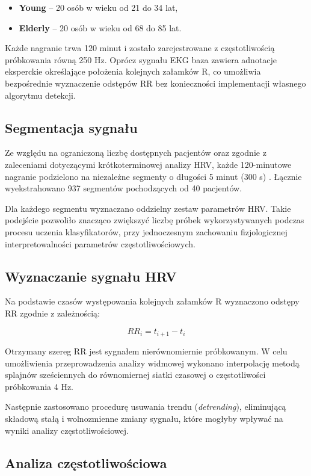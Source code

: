 \documentclass[a4paper,12pt]{article}
\begin{document}
\begin{itemize}
\item \textbf{Young} – 20 osób w wieku od 21 do 34 lat,
\item \textbf{Elderly} – 20 osób w wieku od 68 do 85 lat.
\end{itemize}

Każde nagranie trwa 120 minut i zostało zarejestrowane z częstotliwością próbkowania równą 250 Hz. Oprócz sygnału EKG baza zawiera adnotacje eksperckie określające położenia kolejnych załamków R, co umożliwia bezpośrednie wyznaczenie odstępów RR bez konieczności implementacji własnego algorytmu detekcji.

\subsection{Segmentacja sygnału}

Ze względu na ograniczoną liczbę dostępnych pacjentów oraz zgodnie z zaleceniami dotyczącymi krótkoterminowej analizy HRV, każde 120-minutowe nagranie podzielono na niezależne segmenty o długości 5 minut (300 s) \cite{taskforce}.
Łącznie wyekstrahowano 937 segmentów pochodzących od 40 pacjentów.

Dla każdego segmentu wyznaczano oddzielny zestaw parametrów HRV. Takie podejście pozwoliło znacząco zwiększyć liczbę próbek wykorzystywanych podczas procesu uczenia klasyfikatorów, przy jednoczesnym zachowaniu fizjologicznej interpretowalności parametrów częstotliwościowych.

\subsection{Wyznaczanie sygnału HRV}

Na podstawie czasów występowania kolejnych załamków R wyznaczono odstępy RR zgodnie z zależnością:

\[
RR_i = t_{i+1} - t_i
\]

Otrzymany szereg RR jest sygnałem nierównomiernie próbkowanym. W celu umożliwienia przeprowadzenia analizy widmowej wykonano interpolację metodą splajnów sześciennych do równomiernej siatki czasowej o częstotliwości próbkowania 4 Hz.

Następnie zastosowano procedurę usuwania trendu (\textit{detrending}), eliminującą składową stałą i wolnozmienne zmiany sygnału, które mogłyby wpływać na wyniki analizy częstotliwościowej.

\subsection{Analiza częstotliwościowa}
\end{document}
